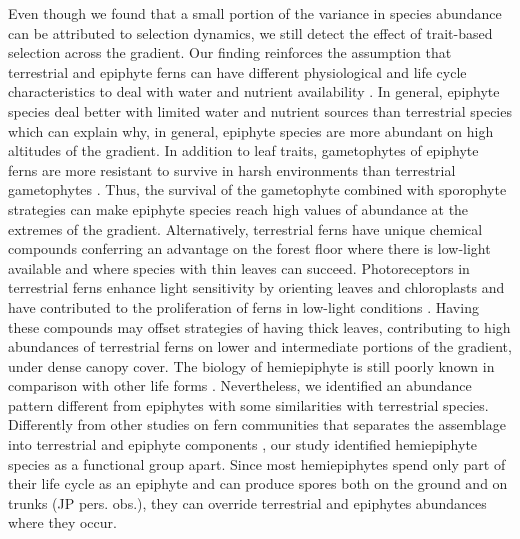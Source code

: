 \documentclass[12pt]{article}
\begin{document}
Even though we found that a small portion of the variance in species
abundance can be attributed to selection dynamics, we still detect the
effect of trait-based selection across the gradient.  Our finding
reinforces the assumption that terrestrial and epiphyte ferns can have
different physiological and life cycle characteristics to deal with
water and nutrient availability \citep{Page2002, Watkins2012}. In
general, epiphyte species deal better with limited water and nutrient
sources than terrestrial species \citep{Page2002, Schuettpelz2009,
  Watkins2012} which can explain why, in general, epiphyte species are
more abundant on high altitudes of the gradient. In addition to leaf
traits, gametophytes of epiphyte ferns are more resistant to survive
in harsh environments than terrestrial gametophytes
\citep{Watkins2012}. Thus, the survival of the gametophyte combined
with sporophyte strategies can make epiphyte species reach high values
of abundance at the extremes of the gradient. Alternatively,
terrestrial ferns have unique chemical compounds conferring an
advantage on the forest floor where there is low-light available
\citep{Kawai2003} and where species with thin leaves can
succeed.
Photoreceptors in terrestrial ferns enhance light sensitivity
by orienting leaves and chloroplasts and have contributed to the
proliferation of ferns in low-light conditions
\citep{Kawai2003}. Having these compounds may offset strategies of
having thick leaves, contributing to high abundances of terrestrial
ferns on lower and intermediate portions of the gradient, under dense
canopy cover.
The biology of hemiepiphyte is still poorly known in
comparison with other life forms \citep{Watkins2012}. Nevertheless, we
identified an abundance pattern different from epiphytes with some
similarities with terrestrial species. Differently from other studies
on fern communities that separates the assemblage into terrestrial and
epiphyte components \citep{WatkinsJr2006, Kluge2010}, our study
identified hemiepiphyte species as a functional group apart. Since
most hemiepiphytes spend only part of their life cycle as an epiphyte
and can produce spores both on the ground and on trunks (JP
pers. obs.), they can override terrestrial and epiphytes abundances
where they occur.
\end{document}
